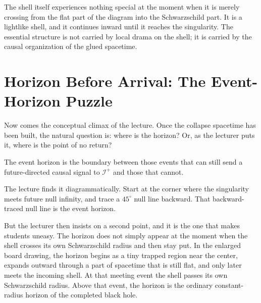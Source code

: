 The shell itself experiences nothing special at the moment when it is merely crossing from the flat part of the diagram into the Schwarzschild part. It is a lightlike shell, and it continues inward until it reaches the singularity. The essential structure is not carried by local drama on the shell; it is carried by the causal organization of the glued spacetime.

\section{Horizon Before Arrival: The Event-Horizon Puzzle}

Now comes the conceptual climax of the lecture. Once the collapse spacetime has been built, the natural question is: where is the horizon? Or, as the lecturer puts it, where is the point of no return?

\begin{definition}
The event horizon is the boundary between those events that can still send a future-directed causal signal to \(\mathscr I^+\) and those that cannot.
\end{definition}

The lecture finds it diagrammatically. Start at the corner where the singularity meets future null infinity, and trace a \(45^\circ\) null line backward. That backward-traced null line is the event horizon.

But the lecturer then insists on a second point, and it is the one that makes students uneasy. The horizon does not simply appear at the moment when the shell crosses its own Schwarzschild radius and then stay put. In the enlarged board drawing, the horizon begins as a tiny trapped region near the center, expands outward through a part of spacetime that is still flat, and only later meets the incoming shell. At that meeting event the shell passes its own Schwarzschild radius. Above that event, the horizon is the ordinary constant-radius horizon of the completed black hole.

